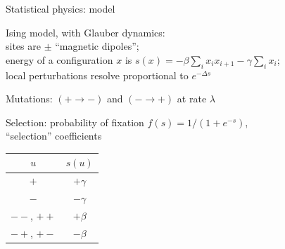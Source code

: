 \documentclass[smaller]{beamer}
\begin{document}
\begin{frame}{Statistical physics: model}

  Ising model, with Glauber dynamics: \\
  \hspace{2em} sites are $\pm $ ``magnetic dipoles''; \\
  \hspace{2em}   energy of a configuration $x$ is $s(x) = - \beta \sum_i x_i x_{i+1} - \gamma \sum_i x_i$; \\
   \hspace{2em}  local perturbations resolve proportional to $e^{-\Delta s}$

   \vspace{2em}

   Mutations: $(+ \to -)$ and $(- \to +)$ at rate $\lambda$

   \vspace{2em}

  Selection: probability of fixation $f(s) = 1/(1+e^{-s})$, \\
  \hspace{3em} ``selection'' coefficients
  \begin{center}
    \begin{tabular}{c|c}
      $u$  &  $s(u)$ \\
      \hline
      $+$ & $+\gamma$ \\
      $-$ & $-\gamma$ \\
      $--$, $++$  & $+\beta$ \\
      $-+$, $+-$  & $-\beta$ 
    \end{tabular}
  \end{center}

\end{frame}
\end{document}
